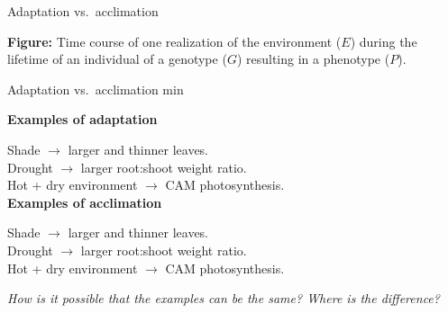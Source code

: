 \documentclass[10pt]{beamer}
\begin{document}
\begin{frame}{Adaptation vs.\ acclimation}
{%
}%

\textrm{\textbf{Figure:} Time course of one realization of the environment ($E$) during the lifetime of an individual of a genotype ($G$) resulting in a phenotype ($P$).}
\end{frame}

\begin{frame}{Adaptation vs.\ acclimation  min}

\textbf{Examples of adaptation}

Shade $\rightarrow$ larger and thinner leaves.\\
Drought $\rightarrow$ larger root:shoot weight ratio.\\
Hot + dry environment $\rightarrow$ CAM photosynthesis.\\[2ex]

\textbf{Examples of acclimation}

Shade $\rightarrow$ larger and thinner leaves.\\
Drought $\rightarrow$ larger root:shoot weight ratio.\\
Hot + dry environment $\rightarrow$ CAM photosynthesis.\\[2ex]
\pause

\DiscussionI \emph{How is it possible that the examples can be the same? Where is the difference?}

\end{frame}
\end{document}
